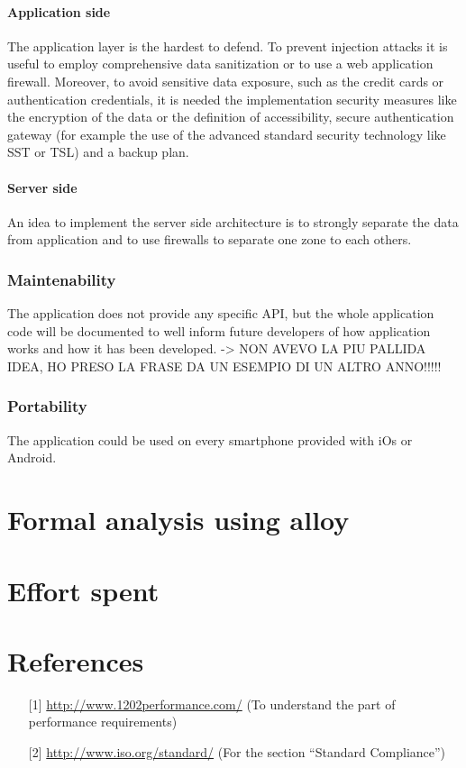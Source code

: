 \documentclass[12pt,titlepage]{article}
\begin{document}
\paragraph{Application side}
The application layer is the hardest to defend. To prevent injection attacks it is useful to employ comprehensive data sanitization or to use a web application firewall. Moreover, to avoid sensitive data exposure, such as the credit cards or authentication credentials, it is needed the implementation security measures like the encryption of the data or the definition of accessibility, secure authentication gateway (for example the use of the advanced standard security technology like SST or TSL) and a backup plan.

\paragraph{Server side}
An idea to implement the server side architecture is to strongly separate the data from application and to use firewalls to separate one zone to each others. 


\subsubsection{Maintenability}\label{sec:mod1}
The application does not provide any specific API, but the whole application code will be documented to well inform future developers of how application works and how it has been developed. -> NON AVEVO LA PIU PALLIDA IDEA, HO PRESO LA FRASE DA UN ESEMPIO DI UN ALTRO ANNO!!!!!

\subsubsection{Portability}\label{sec:mod1}
The application could be used on every smartphone provided with iOs or Android. 

\section{Formal analysis using alloy}\label{sec:crit}
\section{Effort spent}\label{sec:crit}
\section{References}\label{sec:crit}
\begin{itemize}
\item [{[1]}] \url{http://www.1202performance.com/} (To understand the part of performance requirements)
\item [{[2]}] \url{http://www.iso.org/standard/} (For the section ``Standard Compliance'')
\end{itemize}
\end{document}
